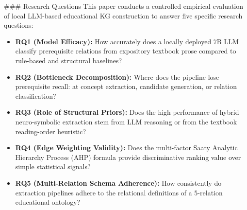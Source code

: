 \documentclass[11pt,a4paper]{article}
\begin{document}
### Research Questions
This paper conducts a controlled empirical evaluation of local LLM-based educational KG construction to answer five specific research questions:
\begin{itemize}[leftmargin=*,itemsep=1pt]
  \item \textbf{RQ1 (Model Efficacy):} How accurately does a locally deployed 7B LLM classify prerequisite relations from expository textbook prose compared to rule-based and structural baselines?
  \item \textbf{RQ2 (Bottleneck Decomposition):} Where does the pipeline lose prerequisite recall: at concept extraction, candidate generation, or relation classification?
  \item \textbf{RQ3 (Role of Structural Priors):} Does the high performance of hybrid neuro-symbolic extraction stem from LLM reasoning or from the textbook reading-order heuristic?
  \item \textbf{RQ4 (Edge Weighting Validity):} Does the multi-factor Saaty Analytic Hierarchy Process (AHP) formula provide discriminative ranking value over simple statistical signals?
  \item \textbf{RQ5 (Multi-Relation Schema Adherence):} How consistently do extraction pipelines adhere to the relational definitions of a 5-relation educational ontology?
\end{itemize}
\end{document}
